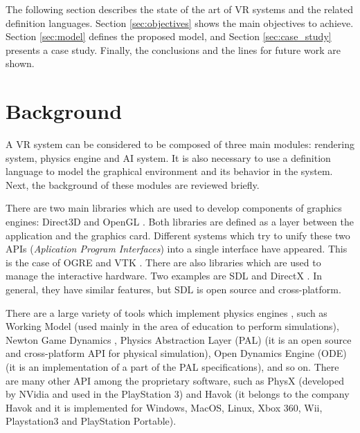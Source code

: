 \documentclass[12pt]{article}
\begin{document}
The following section describes the state of the art of VR systems and the related definition
languages. Section \ref{sec:objectives} shows the main objectives to achieve. Section
\ref{sec:model} defines the proposed model, and Section \ref{sec:case_study} presents a case study.
Finally, the conclusions and the lines for future work are shown.



\section{Background
\label{sec:background}}

A VR system can be considered to be composed of three main modules: rendering system, physics
engine and AI system. It is also necessary to use a definition language to model the graphical
environment and its behavior in the system. Next, the background of these modules are reviewed
briefly.

There are two main libraries which are used to develop components of graphics engines: Direct3D
\cite{DirectX} and OpenGL \cite{OpenGL}. Both libraries are defined as a layer between the
application and the graphics card. Different systems which try to unify these two APIs
(\textit{Aplication Program Interfaces}) into a single interface have appeared. This is the case of
OGRE \cite{OGRE} and VTK \cite{VTK}. There are also libraries which are used to manage the
interactive hardware. Two examples are SDL \cite{SDL} and DirectX \cite{DirectX}. In general, they
have similar features, but SDL is open source and cross-platform.

There are a large variety of tools which implement physics engines \cite{Seugling2006}, such as Working Model
\cite{WModel} (used mainly in the area of education to perform simulations), Newton Game
Dynamics \cite{NGDynamics}, Physics Abstraction Layer (PAL) \cite{PAL} (it is an open source and
cross-platform API for physical simulation), Open Dynamics Engine (ODE) \cite{ODE} (it is an
implementation of a part of the PAL specifications), and so on.  There are many other API among
the proprietary software, such as PhysX \cite{Physx} (developed by NVidia
and used in the PlayStation 3) and Havok \cite{Havok} (it belongs to the company Havok and it is
implemented for Windows, MacOS, Linux, Xbox 360, Wii, Playstation3 and PlayStation Portable).
\end{document}

